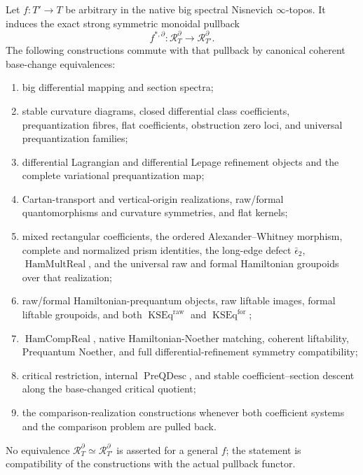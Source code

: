 \begin{theorem}
\label{thm:prequantum-arbitrary-native-base-change}
Let $f:T'\to T$ be arbitrary in the native big spectral Nisnevich
$\infty$-topos.  It induces the exact strong symmetric monoidal pullback
\[
f^{*,\partial}:\mathcal R_T^\partial\longrightarrow\mathcal R_{T'}^\partial.
\]
The following constructions commute with that pullback by canonical coherent
base-change equivalences:
\begin{enumerate}
\item big differential mapping and section spectra;
\item stable curvature diagrams, closed differential class coefficients,
      prequantization fibres, flat coefficients, obstruction zero loci, and
      universal prequantization families;
\item differential Lagrangian and differential Lepage refinement objects and the
      complete variational prequantization map;
\item Cartan-transport and vertical-origin realizations, raw/formal
      quantomorphisms and curvature symmetries, and flat kernels;
\item mixed rectangular coefficients, the ordered Alexander--Whitney morphism,
      complete and normalized prism identities, the long-edge defect
      $\bar\epsilon_2$, $\operatorname{HamMultReal}$, and the universal raw and
      formal Hamiltonian groupoids over that realization;
\item raw/formal Hamiltonian-prequantum objects, raw liftable images, formal
      liftable groupoids, and both $\operatorname{KSEq}^{\mathrm{raw}}$ and
      $\operatorname{KSEq}^{\mathrm{for}}$;
\item $\operatorname{HamCompReal}$, native Hamiltonian-Noether matching,
      coherent liftability, Prequantum Noether, and full differential-refinement
      symmetry compatibility;
\item critical restriction, internal $\operatorname{PreQDesc}$, and stable
      coefficient--section descent along the base-changed critical quotient;
\item the comparison-realization constructions whenever both coefficient systems
      and the comparison problem are pulled back.
\end{enumerate}
No equivalence $\mathcal R_T^\partial\simeq\mathcal R_{T'}^\partial$ is asserted
for a general $f$; the statement is compatibility of the constructions with the
actual pullback functor.
\end{theorem}


